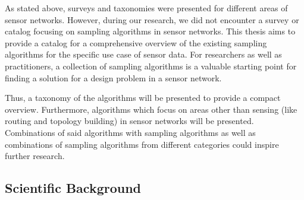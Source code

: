 As stated above, surveys and taxonomies were presented for different areas of sensor networks. 
However, during our research, we did not encounter a survey or catalog focusing on sampling algorithms in sensor networks. 
This thesis aims to provide a catalog for a comprehensive overview of the existing sampling algorithms for the specific use case of sensor data. 
For researchers as well as practitioners, a collection of sampling algorithms is a valuable starting point for finding a solution for a design problem in a sensor network. \par
Thus, a taxonomy of the algorithms will be presented to provide a compact overview. 
Furthermore, algorithms which focus on areas other than sensing (like routing and topology building) in sensor networks will be presented. 
Combinations of said algorithms with sampling algorithms as well as combinations of sampling algorithms from different categories could inspire further research.


\subsection{Scientific Background}
\label{sec:Scientific Background}

